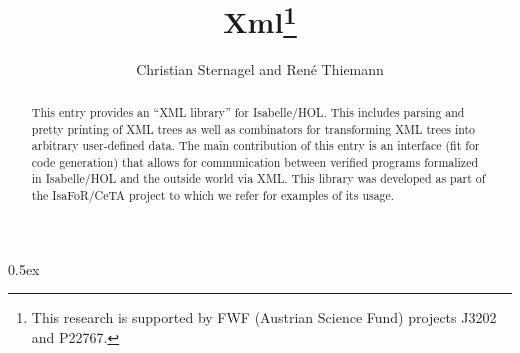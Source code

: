 \documentclass[11pt,a4paper]{article}
\begin{document}
\title{Xml\thanks{This research is supported by FWF (Austrian Science Fund) projects J3202 and P22767.}}
\author{Christian Sternagel and Ren\'e Thiemann}
\maketitle

\begin{abstract}
This entry provides an ``XML library'' for Isabelle/HOL. This includes parsing
and pretty printing of XML trees as well as combinators for transforming XML
trees into arbitrary user-defined data. The main contribution of this entry is
an interface (fit for code generation) that allows for communication between
verified programs formalized in Isabelle/HOL and the outside world via XML. This
library was developed as part of the IsaFoR/CeTA project to which we refer for
examples of its usage. 
\end{abstract}

\tableofcontents

\parindent 0pt\parskip 0.5ex



%
%
\end{document}
